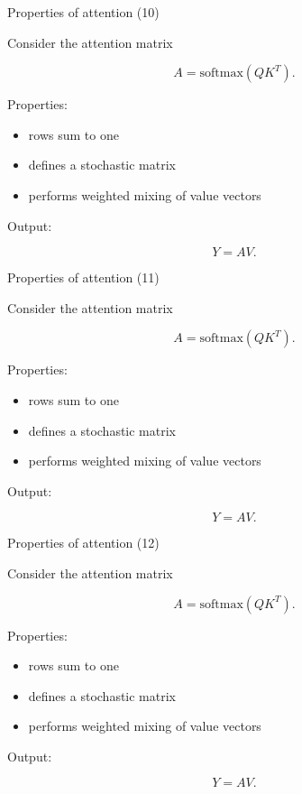 \documentclass[aspectratio=169]{beamer}
\begin{document}
\begin{frame}{Properties of attention (10)}

Consider the attention matrix

\[
A = \text{softmax}(QK^T).
\]

Properties:

\begin{itemize}
\item rows sum to one
\item defines a stochastic matrix
\item performs weighted mixing of value vectors
\end{itemize}

Output:

\[
Y = AV.
\]

\end{frame}


\begin{frame}{Properties of attention (11)}

Consider the attention matrix

\[
A = \text{softmax}(QK^T).
\]

Properties:

\begin{itemize}
\item rows sum to one
\item defines a stochastic matrix
\item performs weighted mixing of value vectors
\end{itemize}

Output:

\[
Y = AV.
\]

\end{frame}


\begin{frame}{Properties of attention (12)}

Consider the attention matrix

\[
A = \text{softmax}(QK^T).
\]

Properties:

\begin{itemize}
\item rows sum to one
\item defines a stochastic matrix
\item performs weighted mixing of value vectors
\end{itemize}

Output:

\[
Y = AV.
\]

\end{frame}
\end{document}
